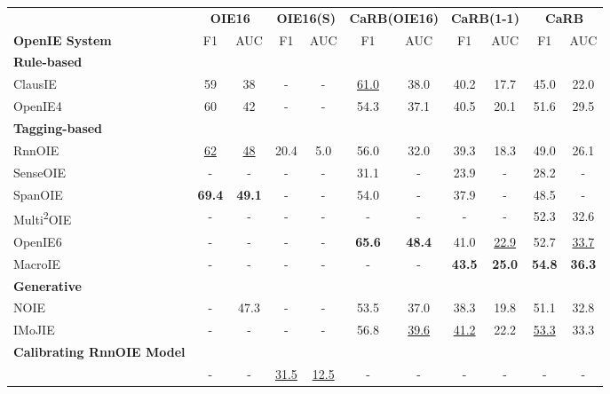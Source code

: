 \documentclass{article}
\begin{document}
\begin{table*}[th]
  \centering
  \small
  \begin{tabular}{l | c c | c c |c c | c c| c c}
    \toprule
     & \multicolumn{2}{c|}{\textbf{OIE16}}
     & \multicolumn{2}{c|}{\textbf{OIE16(S)}}
     & \multicolumn{2}{c|}{\textbf{CaRB(OIE16)}} & \multicolumn{2}{c|}{\textbf{CaRB(1-1)}} & \multicolumn{2}{c}{\textbf{CaRB}}  \\
     \textbf{OpenIE System} & F1 & AUC & F1 & AUC & F1 & AUC & F1 & AUC & F1 & AUC \\
    \midrule
    \textbf{Rule-based} & & & & & & & &  \\
    ClausIE \cite{corro-2013-clausie} & 59 & 38 & - & - & \underline{61.0} & 38.0 & 40.2 & 17.7 & 45.0 & 22.0 \\
    OpenIE4 \cite{Mausam2016openie4} & 60 & 42 & - & - & 54.3 & 37.1 & 40.5 & 20.1 & 51.6 & 29.5 \\
    \midrule
    \textbf{Tagging-based} & & & & & & & &  \\
    RnnOIE \cite{stanovsky-etal-2018-supervised} & \underline{62} & \underline{48} & 20.4 & 5.0 & 56.0 & 32.0 & 39.3 & 18.3 & 49.0 & 26.1 \\
    SenseOIE \cite{roy-etal-2019-supervising} & - & - & - & - & 31.1 & - & 23.9 & - & 28.2 & - \\
    SpanOIE \cite{zhanandzhao-2020-span} & \textbf{69.4} & \textbf{49.1} & - & - & 54.0 & - & 37.9 & - & 48.5 & - \\
    Multi\textsuperscript{2}OIE \cite{ro-etal-2020-multi} & - & - & - & - & - & - & - & - & 52.3 & 32.6 \\
    OpenIE6 \cite{kolluru-etal-2020-openie6} & - & - & - & - & \textbf{65.6} & \textbf{48.4} & 41.0 & \underline{22.9} & 52.7 & \underline{33.7} \\
    MacroIE \cite{yu2021maximal} & - & - & - & - & - & - & \textbf{43.5} & \textbf{25.0} & \textbf{54.8} & \textbf{36.3} \\
    \midrule
    \textbf{Generative} & & & & & & & & \\
    NOIE \cite{cui-etal-2018-neural} & - & 47.3 & - & - & 53.5 & 37.0 & 38.3 & 19.8 & 51.1 & 32.8 \\
    IMoJIE \cite{kolluru-etal-2020-imojie} & - & - & - & - & 56.8 & \underline{39.6} & \underline{41.2} & 22.2 &  \underline{53.3} & 33.3 \\
    \midrule
    \textbf{Calibrating RnnOIE Model} & & & & & & & & \\
    \cite{jiang-etal-2019-improving} & - & - & \underline{31.5} & \underline{12.5} & - & - & - & - & - & - \\

\end{tabular}
\end{table*}
\end{document}

